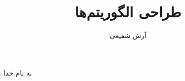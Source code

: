 \documentclass[aspectratio=169]{beamer}
\title{طراحی الگوریتم‌ها}
\author{
آرش شفیعی
}
\institute{
\\
\texttt{[image: logos/ui.png]}
}
\date{}
\begin{document}
\begin{frame}[plain]
\begin{center}
به نام خدا
\end{center}

\maketitle


\end{frame}
\setcounter{framenumber}{0}

%

\raggedleft




%
%
\end{document}
